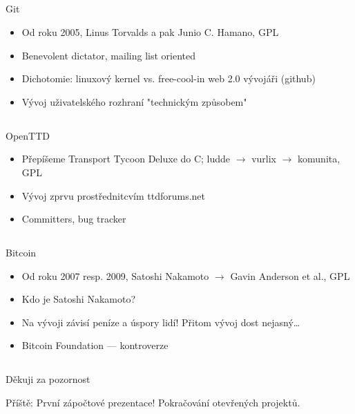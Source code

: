 \documentclass{beamer}
\begin{document}
\subsection{}
\begin{frame}{Git}
\begin{itemize}
\item Od roku 2005, Linus Torvalds a pak Junio C. Hamano, GPL
\item Benevolent dictator, mailing list oriented
\item Dichotomie: linuxový kernel vs. free-cool-in web 2.0 vývojáři (github)
\item Vývoj uživatelského rozhraní "technickým způsobem"
\end{itemize}
\end{frame}

\subsection{}
\begin{frame}{OpenTTD}
\begin{itemize}
\item Přepíšeme Transport Tycoon Deluxe do C; ludde $\to$ vurlix $\to$ komunita, GPL
\item Vývoj zprvu prostřednitcvím ttdforums.net
\item Committers, bug tracker
\end{itemize}
\end{frame}

\subsection{}
\begin{frame}{Bitcoin}
\begin{itemize}
\item Od roku 2007 resp. 2009, Satoshi Nakamoto $\to$ Gavin Anderson et al., GPL
\item Kdo je Satoshi Nakamoto?
\item Na vývoji závisí peníze a úspory lidí! Přitom vývoj dost nejasný\dots
\item Bitcoin Foundation --- kontroverze
\end{itemize}
\end{frame}


\subsection{}
\begin{frame}{Děkuji za pozornost}
\begin{center}
Příště: První zápočtové prezentace! Pokračování otevřených projektů.
\end{center}
\end{frame}
\end{document}
